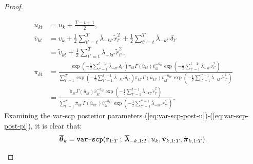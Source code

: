 \begin{proof}
\begin{enumerate}[label=\roman*.]
\begin{align*}
    \overline{u}_{kt} &= u_{k} + \frac{T-t+1}{2}, \\
    \overline{v}_{kt} &= v_{k} + \frac{1}{2}\sum_{t'=t}^{T}\overline{\lambda}_{-kt'}\tilde{r}^2_{t'} + \frac{1}{2}\sum_{t'=t}^{T}\overline{\lambda}_{-kt'}\delta_{t'} \\
    &= \tilde{v}_{kt} + \frac{1}{2}\sum_{t'=t}^{T}\overline{\lambda}_{-kt'}\tilde{r}^2_{t'}, \\
    \overline{\pi}_{kt}  &= \frac{\exp\left(-\frac{1}{2}\sum_{t'=1}^{t-1}\overline{\lambda}_{-kt'}\delta_{t'}\right)\pi_{kt}\Gamma(\overline{u}_{kt})\overline{v}_{kt}^{-\overline{u}_{kt}}\exp\left( -\frac{1}{2} \sum_{t'=1}^{t-1} \overline{\lambda}_{-kt'}\tilde{r}_{t'}^2 \right)}{\sum_{t'=1}^T \exp\left(-\frac{1}{2}\sum_{t''=1}^{t'-1}\overline{\lambda}_{-kt''}\delta_{t''}\right) \pi_{kt'}\Gamma(\overline{u}_{kt'})\overline{v}_{kt'}^{-\overline{u}_{kt'}}\exp\left( -\frac{1}{2} \sum_{t''=1}^{t'-1} \overline{\lambda}_{-kt''}\tilde{r}_{t''}^2\right)} \\
    &= \frac{\tilde{\pi}_{kt}\Gamma(\overline{u}_{kt})\overline{v}_{kt}^{-\overline{u}_{kt}}\exp\left( -\frac{1}{2} \sum_{t'=1}^{t-1} \overline{\lambda}_{-kt'}\tilde{r}_{t'}^2 \right)}{\sum_{t'=1}^T \tilde{\pi}_{kt'}\Gamma(\overline{u}_{kt'})\overline{v}_{kt'}^{-\overline{u}_{kt'}}\exp\left( -\frac{1}{2} \sum_{t''=1}^{t'-1} \overline{\lambda}_{-kt''}\tilde{r}_{t''}^2\right)}.
\end{align*}
Examining the var-scp posterior parameters (\ref{eq:var-scp-post-u})-(\ref{eq:var-scp-post-pi}), it is clear that:
\begin{align*}
    \overline{\boldsymbol{\theta}}_k = \normalfont{\texttt{var-scp}}(\tilde{\mathbf{r}}_{1:T} \:;\:\overline{\boldsymbol{\lambda}}_{-k,1:T}, u_k, \tilde{\mathbf{v}}_{k,1:T}, \tilde{\boldsymbol{\pi}}_{k,1:T}).  
\end{align*}


\end{enumerate}
\end{proof}
